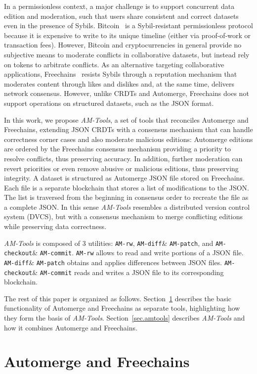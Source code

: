 \documentclass[12pt]{article}
\newcommand{\AMT}      {\emph{AM-Tools}\xspace}
\newcommand{\amrw}       {\texttt{AM-rw}\xspace}
\newcommand{\amdiff}     {\texttt{AM-diff}\xspace}
\newcommand{\ampatch}    {\texttt{AM-patch}\xspace}
\newcommand{\amcheckout} {\texttt{AM-checkout}\xspace}
\newcommand{\amcommit}   {\texttt{AM-commit}\xspace}
\begin{document}
In a permissionless context, a major challenge is to support concurrent data
edition and moderation, such that users share consistent and correct datasets
even in the presence of Sybils.
%
Bitcoin~\cite{nakamoto2008bitcoin} is a Sybil-resistant permissionless protocol
because it is expensive to write to its unique timeline (either via
proof-of-work or transaction fees).
However, Bitcoin and cryptocurrencies in general provide no subjective means to
moderate conflicts in collaborative datasets, but instead rely on tokens to
arbitrate conflicts.
%
As an alternative targeting collaborative applications,
Freechains~\cite{sant2020freechains} resists Sybils through a reputation
mechanism that moderates content through likes and dislikes and, at the same
time, delivers network consensus.
However, unlike CRDTs and Automerge, Freechains does not support operations on
structured datasets, such as the JSON format.

In this work, we propose \AMT, a set of tools that reconciles Automerge and
Freechains, extending JSON CRDTs with a consensus mechanism that can handle
correctness corner cases and also moderate malicious editions:
Automerge editions are ordered by the Freechains consensus mechanism providing
a priority to resolve conflicts, thus preserving accuracy.
In addition, further moderation can revert priorities or even remove abusive or
malicious editions, thus preserving integrity.
%
A dataset is structured as Automerge JSON file stored on Freechains.
Each file is a separate blockchain that stores a list of modifications to the
JSON.
The list is traversed from the beginning in consensus order to recreate the
file as a complete JSON.
%
In this sense \AMT resembles a distributed version control system (DVCS), but
with a consensus mechanism to merge conflicting editions while
preserving data correctness.

\AMT is composed of 3 utilities: \amrw, \amdiff \& \ampatch, and \amcheckout \&
\amcommit.
%
\amrw allows to read and write portions of a JSON file.
\amdiff \& \ampatch obtains and applies differences between JSON files.
\amcheckout \& \amcommit reads and writes a JSON file to its corresponding
blockchain.

The rest of this paper is organized as follows.
Section~\ref{sec.both} describes the basic functionality of Automerge and
Freechains as separate tools, highlighting how they form the basis of
\AMT.
Section~\ref{sec.amtools} describes \AMT and how it combines Automerge and
Freechains.

\section{Automerge and Freechains}
\label{sec.both}
\end{document}
